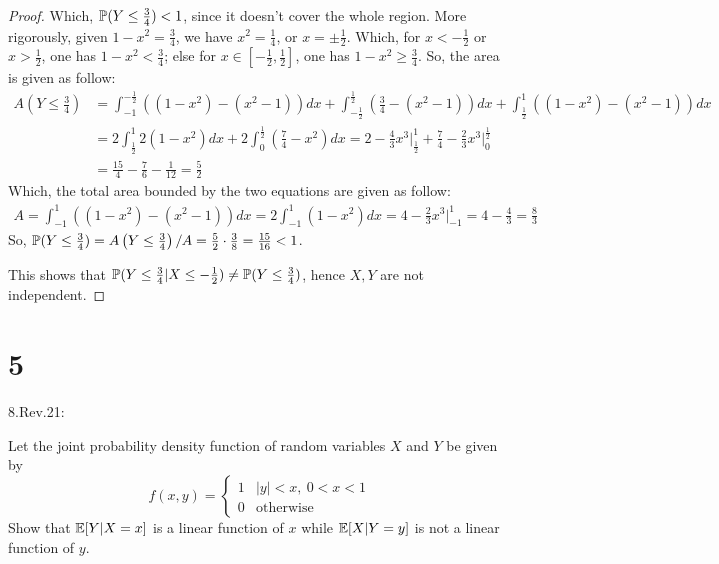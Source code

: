 \documentclass{article}
\begin{document}
\begin{proof}
    Which, $\mathbb{P}(Y\leq \frac{3}{4})<1$, since it doesn't cover the whole region. More rigorously, given $1-x^2 = \frac{3}{4}$, we have $x^2=\frac{1}{4}$, or $x=\pm\frac{1}{2}$. Which, for $x<-\frac{1}{2}$ or $x>\frac{1}{2}$, one has $1-x^2 < \frac{3}{4}$; else for $x\in[-\frac{1}{2},\frac{1}{2}]$, one has $1-x^2\geq \frac{3}{4}$. So, the area is given as follow:
    \begin{align}
        A\left(Y\leq \frac{3}{4}\right) &= \int_{-1}^{-\frac{1}{2}}\left((1-x^2)-(x^2-1)\right)dx + \int_{-\frac{1}{2}}^{\frac{1}{2}}\left(\frac{3}{4}-(x^2-1)\right)dx + \int_{\frac{1}{2}}^{1}\left((1-x^2)-(x^2-1)\right)dx\\
        &= 2\int_{\frac{1}{2}}^{1}2(1-x^2)dx + 2\int_{0}^{\frac{1}{2}}\left(\frac{7}{4}-x^2\right)dx = 2-\frac{4}{3}x^3\bigg|_{\frac{1}{2}}^{1} + \frac{7}{4} - \frac{2}{3}x^3\bigg|_{0}^{\frac{1}{2}}\\
        &= \frac{15}{4} - \frac{7}{6} - \frac{1}{12}= \frac{5}{2}
    \end{align}
    Which, the total area bounded by the two equations are given as follow:
    \begin{align}
        A = \int_{-1}^{1}\left((1-x^2)-(x^2-1)\right)dx = 2\int_{-1}^{1}(1-x^2)dx = 4 - \frac{2}{3}x^3\bigg|_{-1}^{1} = 4-\frac{4}{3} = \frac{8}{3}
    \end{align}
    So, $\mathbb{P}(Y\leq \frac{3}{4}) = A\left(Y\leq \frac{3}{4}\right)/A = \frac{5}{2}\cdot \frac{3}{8} = \frac{15}{16}<1$.

    This shows that $\mathbb{P}(Y\leq \frac{3}{4}|X\leq -\frac{1}{2}) \neq \mathbb{P}(Y\leq \frac{3}{4})$, hence $X,Y$ are not independent.
\end{proof}

\hfil

\hfil

\section*{5}
\begin{ques}\label{q5}
    8.Rev.21:

    Let the joint probability density function of random variables $X$ and $Y$ be given by 
    $$f(x,y)=\begin{cases}
        1 & |y|<x,\ 0<x<1\\
        0 & \text{otherwise}
    \end{cases}$$
    Show that $\mathbb{E}[Y|X=x]$ is a linear function of $x$ while $\mathbb{E}[X|Y=y]$ is not a linear function of $y$.
\end{ques}
\end{document}
